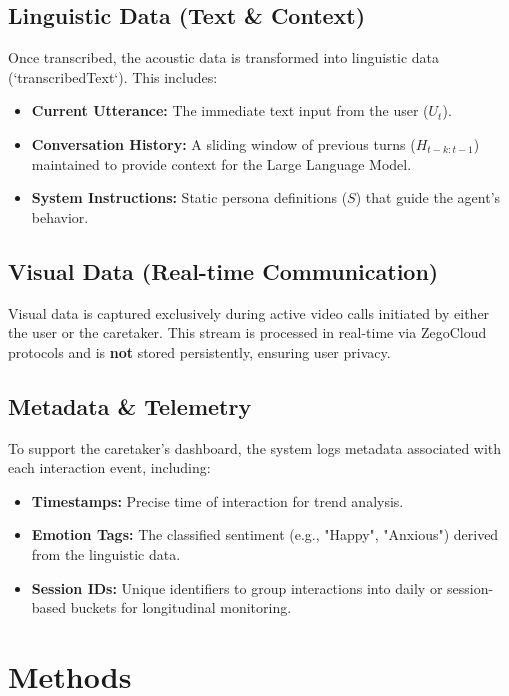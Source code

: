 \subsection{Linguistic Data (Text \& Context)}
Once transcribed, the acoustic data is transformed into linguistic data (`transcribedText`). This includes:
\begin{itemize}
    \item \textbf{Current Utterance:} The immediate text input from the user ($U_t$).
    \item \textbf{Conversation History:} A sliding window of previous turns ($H_{t-k:t-1}$) maintained to provide context for the Large Language Model.
    \item \textbf{System Instructions:} Static persona definitions ($S$) that guide the agent's behavior.
\end{itemize}

\subsection{Visual Data (Real-time Communication)}
Visual data is captured exclusively during active video calls initiated by either the user or the caretaker. This stream is processed in real-time via ZegoCloud protocols and is \textbf{not} stored persistently, ensuring user privacy.

\subsection{Metadata \& Telemetry}
To support the caretaker's dashboard, the system logs metadata associated with each interaction event, including:
\begin{itemize}
    \item \textbf{Timestamps:} Precise time of interaction for trend analysis.
    \item \textbf{Emotion Tags:} The classified sentiment (e.g., "Happy", "Anxious") derived from the linguistic data.
    \item \textbf{Session IDs:} Unique identifiers to group interactions into daily or session-based buckets for longitudinal monitoring.
\end{itemize}
\section{Methods}

